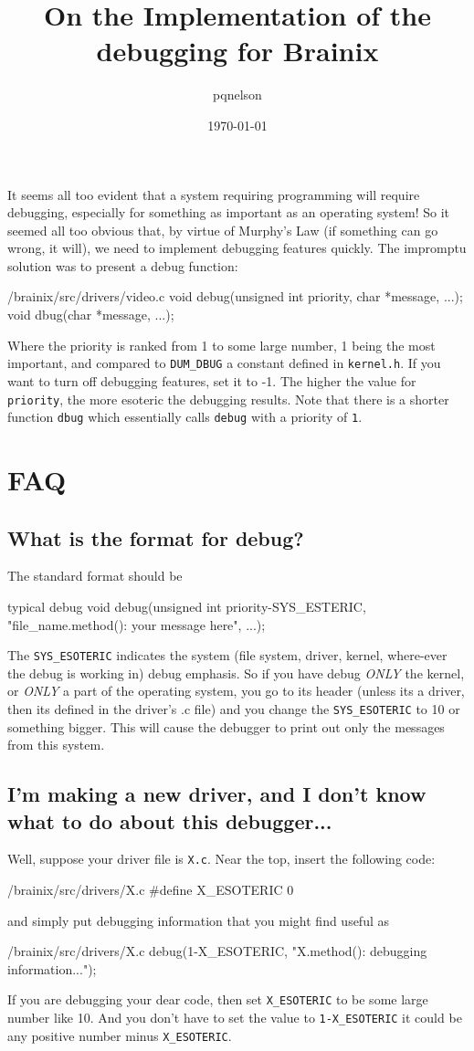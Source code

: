 \documentclass{article}
\title{On the Implementation of the debugging for Brainix}
\author{pqnelson}
\date{\today}
\begin{document}
\maketitle

It seems all too evident that a system requiring programming will require debugging, especially for something as important as an operating system! So it seemed all too obvious that, by virtue of Murphy's Law (if something can go wrong, it will), we need to implement debugging features quickly. The impromptu solution was to present a debug function:
\begin{code}{/brainix/src/drivers/video.c}
void debug(unsigned int priority, char *message, ...);
void dbug(char *message, ...);
\end{code}
Where the priority is ranked from 1 to some large number, 1 being the most important, and compared to \verb|DUM_DBUG| a constant defined in \verb|kernel.h|. If you want to turn off debugging features, set it to -1. The higher the value for \verb|priority|, the more esoteric the debugging results. Note that there is a shorter function \verb|dbug| which essentially calls \verb|debug| with a priority of \verb|1|.
\section{FAQ}
\subsection{What is the format for debug?}
The standard format should be
\begin{code}{typical debug}
void debug(unsigned int priority-SYS_ESTERIC, "file_name.method(): your message here", ...);
\end{code}
The \verb|SYS_ESOTERIC| indicates the system (file system, driver, kernel, where-ever the debug is working in) debug emphasis. So if you have debug \emph{ONLY} the kernel, or \emph{ONLY} a part of the operating system, you go to its header (unless its a driver, then its defined in the driver's .c file) and you change the \verb|SYS_ESOTERIC| to 10 or something bigger. This will cause the debugger to print out only the messages from this system.
\subsection{I'm making a new driver, and I don't know what to do about this debugger...}
Well, suppose your driver file is \verb|X.c|. Near the top, insert the following code:
\begin{code}{/brainix/src/drivers/X.c}
 #define X_ESOTERIC     0
\end{code}
and simply put debugging information that you might find useful as
\begin{code}{/brainix/src/drivers/X.c}
     debug(1-X_ESOTERIC, "X.method(): debugging information...");
\end{code}
If you are debugging your dear code, then set \verb|X_ESOTERIC| to be some large number like 10. And you don't have to set the value to \verb|1-X_ESOTERIC| it could be any positive number minus \verb|X_ESOTERIC|.
\end{document}
